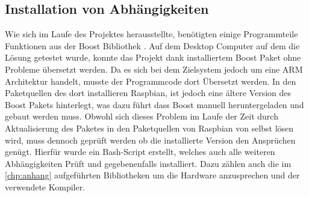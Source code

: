 \subsection{Installation von Abhängigkeiten}\label{kap:ums:abh}
Wie sich im Laufe des Projektes herausstellte, benötigten einige Programmteile Funktionen aus der Boost Bibliothek \cite{BOOK:BOOST}. Auf dem Desktop Computer auf dem die Lösung getestet wurde, konnte das Projekt dank installiertem Boost Paket ohne Probleme übersetzt werden. Da es sich bei dem  Zielsystem jedoch um eine ARM Architektur handelt, musste der Programmcode dort Übersetzt werden. In den Paketquellen des dort installieren Raspbian, ist jedoch eine ältere Version des Boost Pakets hinterlegt, was dazu führt dass Boost manuell heruntergeladen und gebaut werden muss. Obwohl sich dieses Problem im Laufe der Zeit durch Aktualisierung des Paketes in den Paketquellen von Raspbian von selbst lösen wird, muss dennoch geprüft werden ob die installierte Version den Ansprüchen genügt. Hierfür wurde ein Bash-Script erstellt, welches auch alle weiteren Abhängigkeiten Prüft und gegebenenfalls installiert. Dazu zählen auch die im  \autoref{chp:anhang}  aufgeführten Bibliotheken um die Hardware anzusprechen und der verwendete Kompiler. 

\clearpage


